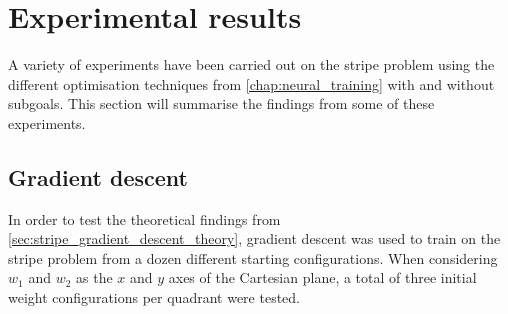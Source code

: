 \section{Experimental results}
A variety of experiments have been carried out on the stripe problem using the different optimisation techniques from \ref{chap:neural_training} with and without subgoals. 
This section will summarise the findings from some of these experiments. 

\subsection{Gradient descent}
\label{sec:stripe_gradient_descent}

In order to test the theoretical findings from \ref{sec:stripe_gradient_descent_theory}, gradient descent was used to train on the stripe problem from a dozen different starting configurations.
When considering $w_1$ and $w_2$ as the $x$ and $y$ axes of the Cartesian plane, a total of three initial weight configurations per quadrant were tested.

